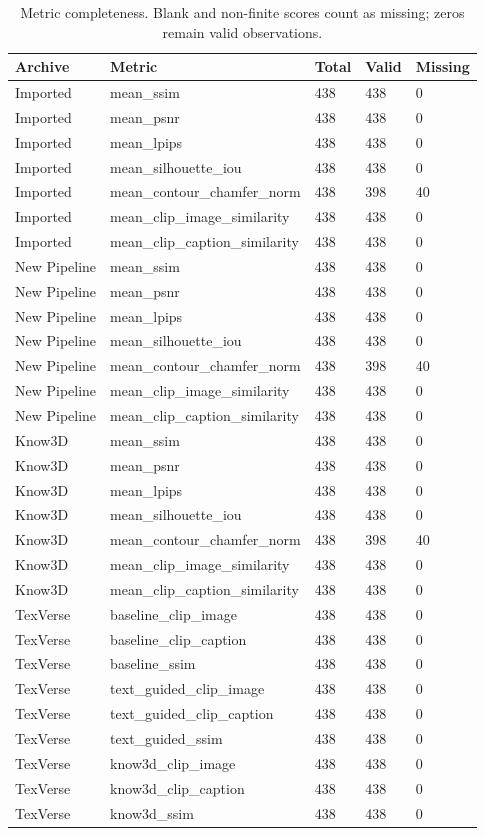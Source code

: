\begin{table}[t]
\centering\small
\caption{Metric completeness. Blank and non-finite scores count as missing; zeros remain valid observations.}
\begin{tabular}{lllll}
\toprule
Archive & Metric & Total & Valid & Missing \\
\midrule
Imported & mean\_ssim & 438 & 438 & 0 \\
Imported & mean\_psnr & 438 & 438 & 0 \\
Imported & mean\_lpips & 438 & 438 & 0 \\
Imported & mean\_silhouette\_iou & 438 & 438 & 0 \\
Imported & mean\_contour\_chamfer\_norm & 438 & 398 & 40 \\
Imported & mean\_clip\_image\_similarity & 438 & 438 & 0 \\
Imported & mean\_clip\_caption\_similarity & 438 & 438 & 0 \\
New Pipeline & mean\_ssim & 438 & 438 & 0 \\
New Pipeline & mean\_psnr & 438 & 438 & 0 \\
New Pipeline & mean\_lpips & 438 & 438 & 0 \\
New Pipeline & mean\_silhouette\_iou & 438 & 438 & 0 \\
New Pipeline & mean\_contour\_chamfer\_norm & 438 & 398 & 40 \\
New Pipeline & mean\_clip\_image\_similarity & 438 & 438 & 0 \\
New Pipeline & mean\_clip\_caption\_similarity & 438 & 438 & 0 \\
Know3D & mean\_ssim & 438 & 438 & 0 \\
Know3D & mean\_psnr & 438 & 438 & 0 \\
Know3D & mean\_lpips & 438 & 438 & 0 \\
Know3D & mean\_silhouette\_iou & 438 & 438 & 0 \\
Know3D & mean\_contour\_chamfer\_norm & 438 & 398 & 40 \\
Know3D & mean\_clip\_image\_similarity & 438 & 438 & 0 \\
Know3D & mean\_clip\_caption\_similarity & 438 & 438 & 0 \\
TexVerse & baseline\_clip\_image & 438 & 438 & 0 \\
TexVerse & baseline\_clip\_caption & 438 & 438 & 0 \\
TexVerse & baseline\_ssim & 438 & 438 & 0 \\
TexVerse & text\_guided\_clip\_image & 438 & 438 & 0 \\
TexVerse & text\_guided\_clip\_caption & 438 & 438 & 0 \\
TexVerse & text\_guided\_ssim & 438 & 438 & 0 \\
TexVerse & know3d\_clip\_image & 438 & 438 & 0 \\
TexVerse & know3d\_clip\_caption & 438 & 438 & 0 \\
TexVerse & know3d\_ssim & 438 & 438 & 0 \\
\bottomrule
\end{tabular}
\end{table}
